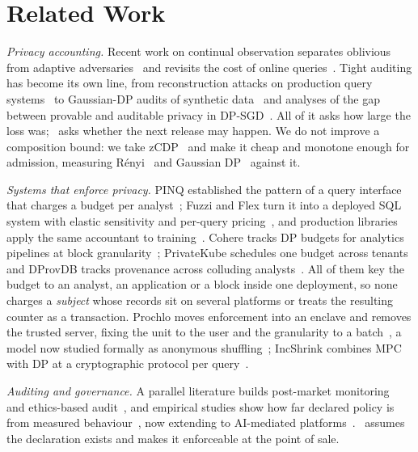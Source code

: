 \section{Related Work}
\label{sec:related}

\emph{Privacy accounting.} Recent work on continual observation separates oblivious
from adaptive adversaries~\cite{bun2026separating} and revisits the cost of online
queries~\cite{bun2016make}. Tight auditing has become its own line, from
reconstruction attacks on production query systems~\cite{cohen2018linear} to
Gaussian-DP audits of synthetic data~\cite{ganev2026tight} and analyses of the gap
between provable and auditable privacy in DP-SGD~\cite{modi2026revisiting}. All of it
asks how large the loss was; \sys\ asks whether the next release may happen. We do
not improve a composition bound: we take zCDP~\cite{bun2016concentrated} and make it
cheap and monotone enough for admission, measuring
R\'enyi~\cite{mironov2017renyi} and Gaussian DP~\cite{dong2021rejoinder} against it.

\emph{Systems that enforce privacy.} PINQ established the pattern of a query interface
that charges a budget per analyst~\cite{ebadi2015featherweight}; Fuzzi and Flex turn it
into a deployed SQL system with elastic sensitivity and per-query
pricing~\cite{johnson2018towards}, and production libraries apply the same accountant to
training~\cite{yousefpour2021opacus,abadi2016deep}. Cohere tracks DP
budgets for analytics pipelines at block granularity~\cite{kchler2024cohere};
PrivateKube schedules one budget across tenants~\cite{luo2021privacy} and DProvDB
tracks provenance across colluding analysts~\cite{zhang2023dprovdb}. All of them key
the budget to an analyst, an application or a block inside one deployment, so none
charges a \emph{subject} whose records sit on several platforms or treats the
resulting counter as a transaction. Prochlo moves enforcement into an enclave and
removes the trusted server, fixing the unit to the user and the granularity to a
batch~\cite{bittau2017prochlo}, a model now studied formally as anonymous
shuffling~\cite{cheu2019distributed}; IncShrink combines MPC with DP at a
cryptographic protocol per query~\cite{wang2022incshrink}.

\emph{Auditing and governance.} A parallel literature builds post-market
monitoring~\cite{mokander2021conformity} and ethics-based
audit~\cite{mokander2021ethicsbased}, and empirical studies show how far declared
policy is from measured behaviour~\cite{kapp2024collection}, now extending to
AI-mediated platforms~\cite{shouli2025ethical}. \sys\ assumes the declaration exists
and makes it enforceable at the point of sale.

